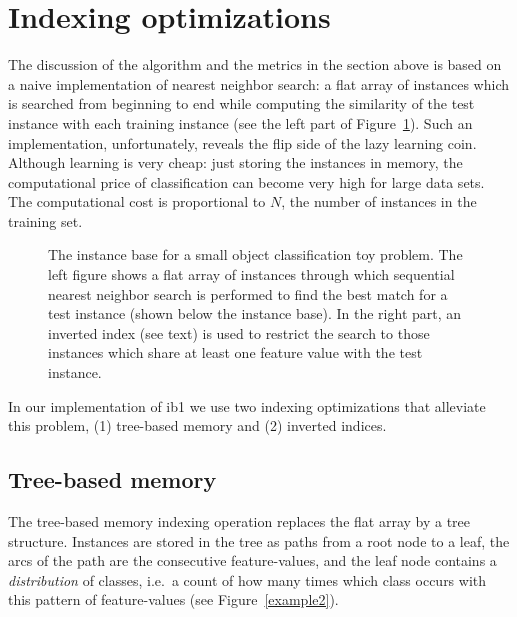 \documentclass{report}
\begin{document}
\section{Indexing optimizations}
\label{indexing}

The discussion of the algorithm and the metrics in the section above
is based on a naive implementation of nearest neighbor search: a flat
array of instances which is searched from beginning to end while
computing the similarity of the test instance with each training
instance (see the left part of Figure~\ref{example1}). Such an
implementation, unfortunately, reveals the flip side of the lazy
learning coin. Although learning is very cheap: just storing the
instances in memory, the computational price of classification can
become very high for large data sets. The computational cost is
proportional to $N$, the number of instances in the training set.

\begin{figure}[htb]
        \begin{center}
                \leavevmode
                \columnwidth
                \caption{The instance base for a small object
                classification toy problem. The left figure shows a
                flat array of instances through which sequential
                nearest neighbor search is performed to find the best 
		match for a test instance (shown below the instance
                base). 
		In the right part, an inverted index (see text)
                is used to restrict the search to those instances
                which share at least one feature value with the test
                instance.
                }
                \label{example1}
        \end{center}
\end{figure}

In our implementation of {\sc ib1} we use two indexing optimizations
that alleviate this problem, (1) tree-based memory and (2) inverted
indices.

\subsection{Tree-based memory}

The tree-based memory indexing operation replaces the flat array
by a tree structure. Instances are stored in the tree as
paths from a root node to a leaf, the arcs of the path are the
consecutive feature-values, and the leaf node contains a {\em
distribution} of classes, i.e.~a count of how many times which class
occurs with this pattern of feature-values (see Figure~\ref{example2}).
\end{document}

